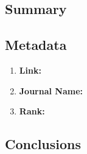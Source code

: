 \documentclass[10pt, oneside]{article}
\begin{document}
\subsection*{Summary}
\cite{chen2012four}

\subsection*{Metadata}
\begin{enumerate}
	\item \textbf{Link:}
	\item \textbf{Journal Name:}
	\item \textbf{Rank:}
\end{enumerate}

\subsection*{Conclusions}


\printbibliography
\end{document}
